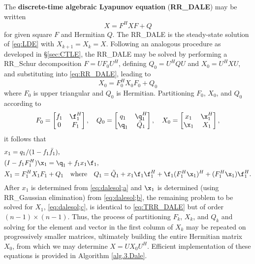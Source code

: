 The {\bf discrete-time algebraic Lyapunov equation} ({\bf RR_DALE}) may be written
\begin{equation}
X = F^H X F + Q
\label{eq:RR_DALE}
\end{equation}
for given square $F$ and Hermitian $Q$.  The RR_DALE is the steady-state solution of \eqref{eq:LDE} with $X_{k+1}=X_k=X$.
Following an analogous procedure as developed in \S \ref{sec:CTLE}, the RR_DALE may be solved by performing a RR_Schur decomposition $F=U F_0 U^{H}$,
defining $Q_0=U^H Q U$ and $X_0=U^H X U$, and substituting into \eqref{eq:RR_DALE}, leading to 
\begin{equation}
X_0 = F_0^H X_0 F_0 + Q_0
\label{eq:TRR_DALE}
\end{equation}
where $F_0$ is upper triangular and $Q_0$ is Hermitian.  Partitioning $F_0$, $X_0$, and $Q_0$ according to
\begin{equation*}
   F_0=\begin{bmatrix} f_1 & \f_1^H \\ 0 & F_1 \end{bmatrix}, \quad
   Q_0=\begin{bmatrix} q_1 & \q_1^H \\ \q_1 & \tilde Q_1 \end{bmatrix}, \quad
   X_0=\begin{bmatrix} x_1 & \x_1^H \\ \x_1 & X_1 \end{bmatrix},
\end{equation*}
it follows that
\begin{subequations}
\label{eq:dalesol}
\begin{align}
 &x_1 = q_1 / (1-f_1 \bar f_1),     \label{eq:dalesol;a} \\
 &(I - f_1 F_1^H) \x_1 = \q_1 + f_1 x_1 \f_1, \label{eq:dalesol;b}\\
 &X_1 = F_1^H X_1 F_1 + Q_1 \quad \textrm{where} \quad Q_1 = \tilde Q_1 + x_1 \f_1 \f_1^H + \f_1 (F_1^H \x_1)^H + (F_1^H \x_1) \f_1^H.  \label{eq:dalesol;c}
\end{align}
\end{subequations}
After $x_1$ is determined from \eqref{eq:dalesol;a} and $\x_1$ is determined (using RR_Gaussian elimination) from \eqref{eq:dalesol;b},
the remaining problem to be solved for $X_1$, \eqref{eq:dalesol;c}, is identical to \eqref{eq:TRR_DALE} but of order $(n-1)\times (n-1)$.  
Thus, the process of partitioning $F_k$, $X_k$, and $Q_k$ and solving for the element and vector in the first
column of $X_k$ may be repeated on progressively smaller matrices, ultimately building
the entire Hermitian matrix $X_0$, from which we may determine $X = U X_0 U^H$.  Efficient implementation of these equations
is provided in Algorithm \ref{alg.3.Dale}.

